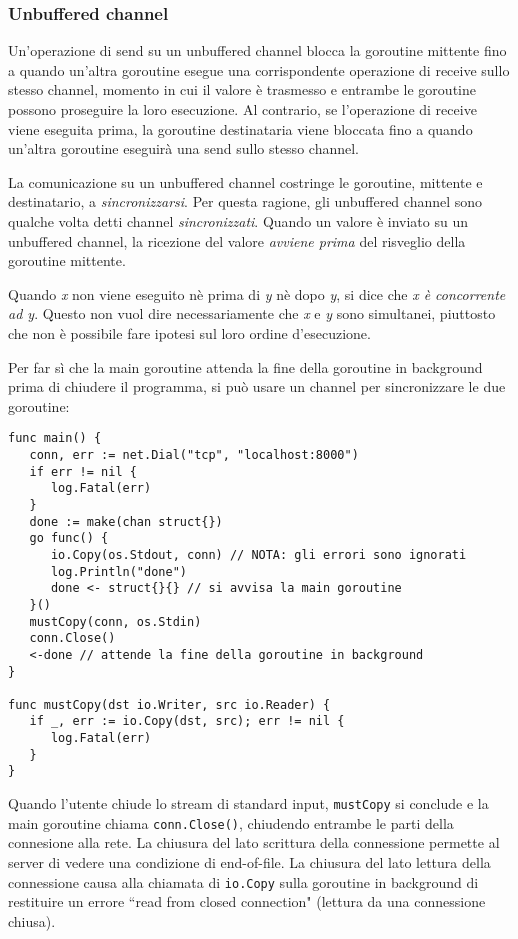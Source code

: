 \documentclass[../../../thesis.tex]{subfiles}
\begin{document}
    \subsubsection{Unbuffered channel}
    Un'operazione di send su un unbuffered channel blocca la goroutine mittente fino a quando un'altra goroutine esegue una corrispondente operazione di receive sullo stesso channel, momento in cui il valore è trasmesso e entrambe le goroutine possono proseguire la loro esecuzione.
    Al contrario, se l'operazione di receive viene eseguita prima, la goroutine destinataria viene bloccata fino a quando un'altra goroutine eseguirà una send sullo stesso channel.
    \hfill \vspace{12pt}

    La comunicazione su un unbuffered channel costringe le goroutine, mittente e destinatario, a \textit{sincronizzarsi}.
    Per questa ragione, gli unbuffered channel sono qualche volta detti channel \textit{sincronizzati}.
    Quando un valore è inviato su un unbuffered channel, la ricezione del valore \textit{avviene prima} del risveglio della goroutine mittente.
    \hfill \vspace{12pt}

    Quando \textit{x} non viene eseguito nè prima di \textit{y} nè dopo \textit{y}, si dice che \textit{x è concorrente ad y}.
    Questo non vuol dire necessariamente che \textit{x} e \textit{y} sono simultanei, piuttosto che non è possibile fare ipotesi sul loro ordine d'esecuzione.
    \hfill \vspace{12pt}

    Per far sì che la main goroutine attenda la fine della goroutine in background prima di chiudere il programma, si può usare un channel per sincronizzare le due goroutine:
    \begin{lstlisting}[frame = single,label={lst:lstlisting7-4-1.1}]
func main() {
   conn, err := net.Dial("tcp", "localhost:8000")
   if err != nil {
      log.Fatal(err)
   }
   done := make(chan struct{})
   go func() {
      io.Copy(os.Stdout, conn) // NOTA: gli errori sono ignorati
      log.Println("done")
      done <- struct{}{} // si avvisa la main goroutine
   }()
   mustCopy(conn, os.Stdin)
   conn.Close()
   <-done // attende la fine della goroutine in background
}

func mustCopy(dst io.Writer, src io.Reader) {
   if _, err := io.Copy(dst, src); err != nil {
      log.Fatal(err)
   }
}
    \end{lstlisting}
    Quando l'utente chiude lo stream di standard input, \verb"mustCopy" si conclude e la main goroutine chiama \verb"conn.Close()", chiudendo entrambe le parti della connesione alla rete.
    La chiusura del lato scrittura della connessione permette al server di vedere una condizione di end-of-file.
    La chiusura del lato lettura della connessione causa alla chiamata di \verb"io.Copy" sulla goroutine in background di restituire un errore ``read from closed connection" (lettura da una connessione chiusa).
    \hfill \vspace{12pt}
\end{document}
